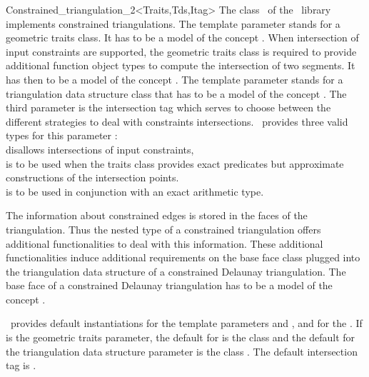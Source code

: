 \begin{ccRefClass}{Constrained_triangulation_2<Traits,Tds,Itag>}
The class \ccRefName\ of the \cgal\ library
implements constrained triangulations.
The template parameter  
stands for a geometric traits class. It has to be a model
of the concept .
When intersection of input constraints are supported, 
the geometric traits class 
is required to provide additional function object  types
to compute the intersection of two segments.
It has then to be a model of the concept
.
The template parameter 
stands for 
a triangulation data structure class that has to be a model
of the concept .
The third parameter  is the intersection tag
which serves  to choose between the different
strategies to deal with constraints intersections. 
\cgal\ provides three valid types for this parameter : \\
 disallows intersections of
 input constraints,\\
 is to be used when the traits
class
provides exact predicates but approximate constructions of the
intersection points.\\
 is to be used in conjunction
with an exact arithmetic type.

 The information about constrained edges is stored in the 
faces of the triangulation. Thus the nested 
type of a constrained triangulation offers
additional functionalities to deal with this information.
These additional functionalities 
induce additional requirements on the base face class
plugged into the triangulation data structure of 
 a constrained Delaunay triangulation.
The base face of a constrained Delaunay triangulation
has to be a model of the concept
.

\cgal\ provides  default instantiations for the template parameters
 and , and for the .
 If  is the geometric traits
parameter,
the default  for
  is the class
and the default for the
triangulation data structure parameter is the class
.
The default intersection tag is .

 

\end{ccRefClass}
